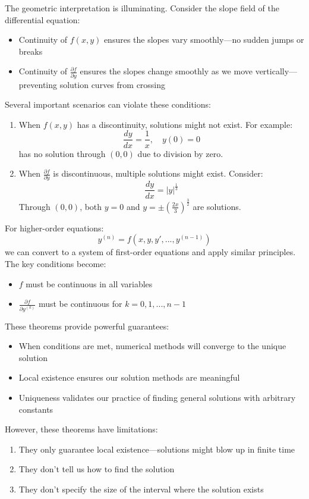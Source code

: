 \noindent The geometric interpretation is illuminating. Consider the slope field of the differential equation:
\begin{itemize}
    \item Continuity of $f(x,y)$ ensures the slopes vary smoothly—no sudden jumps or breaks
    \item Continuity of $\frac{\partial f}{\partial y}$ ensures the slopes change smoothly as we move vertically—preventing solution curves from crossing
\end{itemize}

\noindent Several important scenarios can violate these conditions:
\begin{enumerate}
    \item When $f(x,y)$ has a discontinuity, solutions might not exist. For example:
    \[
    \frac{dy}{dx} = \frac{1}{x}, \quad y(0) = 0
    \]
    has no solution through $(0,0)$ due to division by zero.
    
    \item When $\frac{\partial f}{\partial y}$ is discontinuous, multiple solutions might exist. Consider:
    \[
    \frac{dy}{dx} = |y|^{\frac{1}{3}}
    \]
    Through $(0,0)$, both $y = 0$ and $y = \pm\left(\frac{2x}{3}\right)^{\frac{3}{2}}$ are solutions.
\end{enumerate}

\noindent For higher-order equations:
\[
y^{(n)} = f(x, y, y', ..., y^{(n-1)})
\]
we can convert to a system of first-order equations and apply similar principles. The key conditions become:
\begin{itemize}
    \item $f$ must be continuous in all variables
    \item $\frac{\partial f}{\partial y^{(k)}}$ must be continuous for $k = 0, 1, ..., n-1$
\end{itemize}

\noindent These theorems provide powerful guarantees:
\begin{itemize}
    \item When conditions are met, numerical methods will converge to the unique solution
    \item Local existence ensures our solution methods are meaningful
    \item Uniqueness validates our practice of finding general solutions with arbitrary constants
\end{itemize}

\noindent However, these theorems have limitations:
\begin{enumerate}
    \item They only guarantee local existence—solutions might blow up in finite time
    \item They don't tell us how to find the solution
    \item They don't specify the size of the interval where the solution exists
\end{enumerate}

